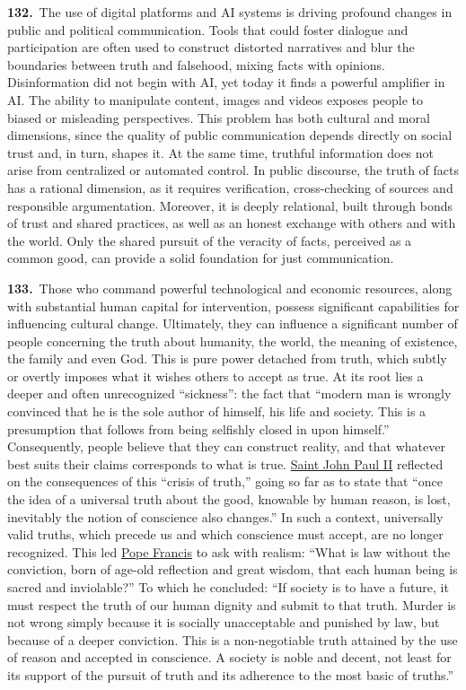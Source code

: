 \documentclass{article}
\begin{document}
\textbf{132.}\ The use of digital platforms and AI systems is driving profound changes in public and political communication. Tools that could foster dialogue and participation are often used to construct distorted narratives and blur the boundaries between truth and falsehood, mixing facts with opinions. Disinformation did not begin with AI, yet today it finds a powerful amplifier in AI. The ability to manipulate content, images and videos exposes people to biased or misleading perspectives. This problem has both cultural and moral dimensions, since the quality of public communication depends directly on social trust and, in turn, shapes it. At the same time, truthful information does not arise from centralized or automated control. In public discourse, the truth of facts has a rational dimension, as it requires verification, cross-checking of sources and responsible argumentation. Moreover, it is deeply relational, built through bonds of trust and shared practices, as well as an honest exchange with others and with the world. Only the shared pursuit of the veracity of facts, perceived as a common good, can provide a solid foundation for just communication.

\textbf{133.}\ Those who command powerful technological and economic resources, along with substantial human capital for intervention, possess significant capabilities for influencing cultural change. Ultimately, they can influence a significant number of people concerning the truth about humanity, the world, the meaning of existence, the family and even God. This is pure power detached from truth, which subtly or overtly imposes what it wishes others to accept as true. At its root lies a deeper and often unrecognized ``sickness'': the fact that ``modern man is wrongly convinced that he is the sole author of himself, his life and society. This is a presumption that follows from being selfishly closed in upon himself.''\cite{n140} Consequently, people believe that they can construct reality, and that whatever best suits their claims corresponds to what is true. \href{https://www.vatican.va/content/john-paul-ii/en.html}{Saint John Paul II} reflected on the consequences of this ``crisis of truth,'' going so far as to state that ``once the idea of a universal truth about the good, knowable by human reason, is lost, inevitably the notion of conscience also changes.''\cite{n141} In such a context, universally valid truths, which precede us and which conscience must accept, are no longer recognized. This led \href{https://www.vatican.va/content/francesco/en.html}{Pope Francis} to ask with realism: ``What is law without the conviction, born of age-old reflection and great wisdom, that each human being is sacred and inviolable?'' To which he concluded: ``If society is to have a future, it must respect the truth of our human dignity and submit to that truth. Murder is not wrong simply because it is socially unacceptable and punished by law, but because of a deeper conviction. This is a non-negotiable truth attained by the use of reason and accepted in conscience. A society is noble and decent, not least for its support of the pursuit of truth and its adherence to the most basic of truths.''\cite{n142}
\end{document}
